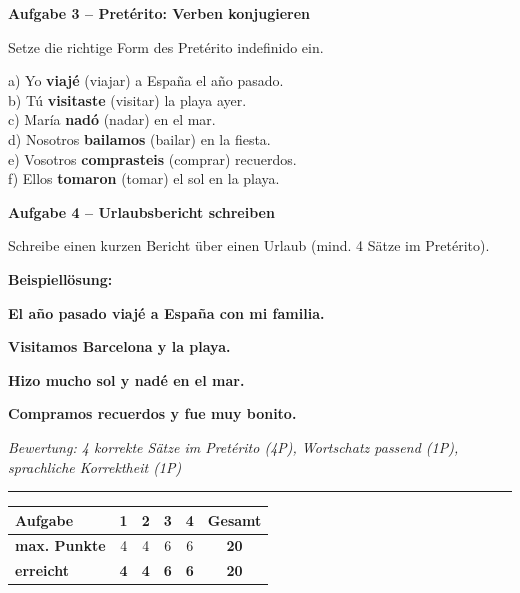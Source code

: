 \documentclass[11pt, a4paper]{article}
\newcommand{\fachfarbe}{spanisch}
\newcommand{\punktebox}[1]{\hfill\fbox{\small \_/#1}}
\newcommand{\lsg}[1]{\textcolor{loesung}{\textbf{#1}}}
\newenvironment{aufgabe}[1]{%
    \needspace{5\baselineskip}%
    \nopagebreak[4]%
    \vspace{10pt}
    \noindent\textbf{\textcolor{\fachfarbe}{Aufgabe #1}}
    \nopagebreak[4]%
    \vspace{5pt}
    \nopagebreak[4]%
    \begin{list}{}{\leftmargin=0pt}
    \item[]
}{%
    \end{list}
}
\begin{document}

\begin{aufgabe}{3 -- Pretérito: Verben konjugieren}
Setze die richtige Form des Pretérito indefinido ein. \punktebox{6}
\end{aufgabe}

\noindent
a) Yo \lsg{viajé} (viajar) a España el año pasado. \\[0.8em]
b) Tú \lsg{visitaste} (visitar) la playa ayer. \\[0.8em]
c) María \lsg{nadó} (nadar) en el mar. \\[0.8em]
d) Nosotros \lsg{bailamos} (bailar) en la fiesta. \\[0.8em]
e) Vosotros \lsg{comprasteis} (comprar) recuerdos. \\[0.8em]
f) Ellos \lsg{tomaron} (tomar) el sol en la playa.

\vspace{15pt}


\begin{aufgabe}{4 -- Urlaubsbericht schreiben}
Schreibe einen kurzen Bericht über einen Urlaub (mind. 4 Sätze im Pretérito). \punktebox{6}
\end{aufgabe}

\textbf{Beispiellösung:}

\lsg{El año pasado viajé a España con mi familia.}

\lsg{Visitamos Barcelona y la playa.}

\lsg{Hizo mucho sol y nadé en el mar.}

\lsg{Compramos recuerdos y fue muy bonito.}

\vspace{0.5em}
\textit{\textcolor{grau}{Bewertung: 4 korrekte Sätze im Pretérito (4P), Wortschatz passend (1P), sprachliche Korrektheit (1P)}}


\vspace{20pt}
\hrule
\vspace{10pt}

\noindent
\begin{tabularx}{\textwidth}{|X|c|c|c|c||c|}
\hline
\textbf{Aufgabe} & 1 & 2 & 3 & 4 & \textbf{Gesamt} \\
\hline
\textbf{max. Punkte} & 4 & 4 & 6 & 6 & \textbf{20} \\
\hline
\textbf{erreicht} & \lsg{4} & \lsg{4} & \lsg{6} & \lsg{6} & \lsg{20} \\
\hline
\end{tabularx}
\end{document}
